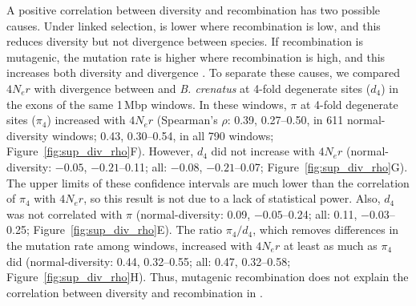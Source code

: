 A positive correlation between diversity and recombination
has two possible causes.
Under linked selection, \Ne{} is lower where recombination is low, and this reduces
diversity but not divergence between species.
If recombination is mutagenic, the mutation rate is higher where recombination is
high, and this increases both diversity and divergence
\citep{begun_levels_1992}.
To separate these causes, we compared $4N_{e}r$ with divergence between \bgla{} and
\textit{B. crenatus} at 4-fold degenerate sites ($d_{4}$) in the exons of the same
1\,Mbp windows.
In these windows, $\pi$ at 4-fold degenerate sites ($\pi_{4}$) increased with
$4N_{e}r$ (Spearman's $\rho$: 0.39, 0.27--0.50, in 611 normal-diversity windows; 0.43,
0.30--0.54, in all 790 windows; Figure~\ref{fig:sup_div_rho}F).
However, $d_{4}$ did not increase with $4N_{e}r$ (normal-diversity: $-0.05$,
$-0.21$--0.11; all: $-0.08$, $-0.21$--0.07; Figure~\ref{fig:sup_div_rho}G).
The upper limits of these confidence intervals are much lower than the correlation of
$\pi_{4}$ with $4N_{e}r$, so this result is not due to a lack of statistical power.
Also, $d_{4}$ was not correlated with $\pi$ (normal-diversity: 0.09, $-0.05$--0.24;
all: 0.11, $-0.03$--0.25; Figure~\ref{fig:sup_div_rho}E).
The ratio $\pi_{4}/d_{4}$, which removes differences in the mutation rate among
windows, increased with $4N_{e}r$ at least as much as $\pi_{4}$ did (normal-diversity:
0.44, 0.32--0.55; all: 0.47, 0.32--0.58; Figure~\ref{fig:sup_div_rho}H).
Thus, mutagenic recombination does not explain the correlation between diversity
and recombination in \bgla{}.
\vspace{0.1cm}

